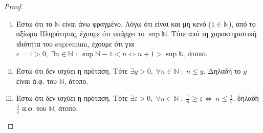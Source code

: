 \documentclass[main.tex]{subfiles}
\begin{document}
      \begin{proof}
      \item {}
          \begin{enumerate}[i)]
              \item Έστω ότι το $ \mathbb{N} $ είναι άνω φραγμένο. Λόγω ότι 
                  είναι και μη κενό ($ 1 \in \mathbb{N} $), από το αξίωμα 
                  Πληρότητας, έχουμε ότι υπάρχει το $ \sup \mathbb{N} $. 
                 Τότε από τη χαρακτηριστική ιδιότητα του supremum, έχουμε 
                 ότι για $ \varepsilon = 1 >0, \; \exists n \in \mathbb{N} 
                 \; : \; \sup \mathbb{N}-1 < n \Leftrightarrow n+1 > \sup
                 \mathbb{N} $, άτοπο.

             \item Έστω ότι δεν ισχύει η πρόταση. Τότε  $ \exists y >0, \; 
                 \forall n \in \mathbb{N} \; : \; n \leq y$. Δηλαδή
                 το  $y$  είναι ά.φ. του $\mathbb{N}$, άτοπο.

             \item Έστω ότι δεν ισχύει η πρόταση. Τότε $ \exists 
                 \varepsilon >0 , \; \forall n \in \mathbb{N} \; : \; 
                 \frac{1}{n} \geq \varepsilon  \Leftrightarrow \ n \leq 
                 \frac{1}{\varepsilon} $, δηλαδή $ \frac{1}{\varepsilon} $ 
                 α.φ. του $ \mathbb{N} $, άτοπο. 
          \end{enumerate}
      \end{proof}
\end{document}
